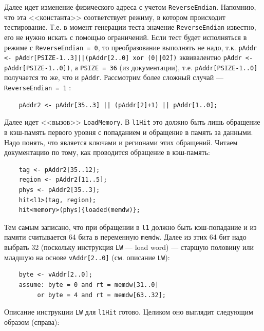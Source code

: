 Далее идет изменение физического адреса с учетом \texttt{ReverseEndian}.
Напомнию, что эта <<константа>> соответствует режиму, в котором происходит
тестирование. Т.е. в момент генерации теста значение \texttt{ReverseEndian}
известно, его не нужно искать с помощью ограничений. Если тест будет исполняться
в режиме с \texttt{ReverseEndian = 0}, то преобразование выполнять не надо, т.к.
\texttt{pAddr <- pАddr[PSIZE-1..3]||(pAddr[2..0] xor (0||0\^2))} эквивалентно
\texttt{pAddr <- pАddr[PSIZE-1..0])}, а \texttt{PSIZE = 36} (из документации),
т.е. \texttt{pАddr[PSIZE-1..0]} получается то же, что и \texttt{pАddr}.
Рассмотрим более сложный случай ---\\ \texttt{ReverseEndian = 1} :
\begin{verbatim}
    pAddr2 <- pAddr[35..3] || (pAddr[2]+1) || pAddr[1..0];
\end{verbatim}

Далее идет <<вызов>> \texttt{LoadMemory}. В \texttt{l1Hit} это должно быть лишь
обращение в кэш-память первого уровня с попаданием и обращение в память за
данными. Надо понять, что является ключами и регионами этих обращений. Читаем
документацию по тому, как проводится обращение в кэш-память:
\begin{verbatim}
    tag <- pAddr2[35..12];
    region <- pAddr2[11..5];
    phys <- pAddr2[35..3];
    hit<l1>(tag, region);
    hit<memory>(phys){loaded(memdw)};
\end{verbatim}

Тем самым записано, что при обращении в \texttt{l1} должно быть кэш-попадание и
из памяти считывается 64 бита в переменную \texttt{memdw}. Далее из этих 64 бит
надо выбрать 32 (поскольку инструкция \texttt{LW} --- load word) --- старшую
половину или младшую на основе \texttt{vAddr[2..0]} (см. описание \texttt{LW}):
\begin{verbatim}
    byte <- vAddr[2..0];
    assume: byte = 0 and rt = memdw[31..0]
         or byte = 4 and rt = memdw[63..32];
\end{verbatim}

Описание инструкции \texttt{LW} для \texttt{l1Hit} готово. Целиком оно выглядит
следующим образом (справа):

